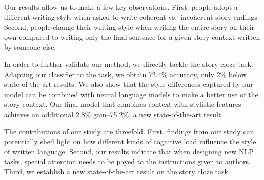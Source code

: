 \documentclass[11pt,a4paper]{article}
\newcommand{\secref}[1]{Section~\ref{ssec:#1}}
\newcommand{\com}[1]{}
\newcommand{\resolved}[1]{}
\newcommand{\shortv}[1]{}
\newcommand{\roy}[1]{{\color{orange}\textsc{[#1 --rs]}}}
\newcommand{\nascomment}[1]{{\color{blue}\textsc{[#1 --nas]}}}
\newcommand{\clinic}[1]{{\color{magenta}\textsc{[#1 --CLINIC]}}}
\renewcommand{\roy}[1]{{\color{orange}[#1 --rs]}}
\renewcommand{\roy}[1]{#1}
\renewcommand{\nascomment}[1]{}
\begin{document}
Our results allow us to make a few key observations.
First, people adopt a different writing style when asked to write coherent vs.~incoherent story endings.
Second,  people change their writing style when writing the entire story on their own compared to 
writing only the final sentence for a given story context written by someone else.


In order to further validate our method, we directly tackle the
story cloze task\nascomment{cite the challenge?  a reader may
  not realize that there is a shared task on this}\resolved{\roy{Maybe ``challenge'' was not the right term here. We basically mean the story cloze task. The shared task was the original task w/o any modification, so I am not referring to it specifically here}}. 
 Adapting our classifier to the task, we obtain 72.4\% accuracy, \com{a
 12.5\% increase over the previously reported state-of-the-art  \cite{Salle:2016}}\roy{only 2\% below state-of-the-art results}.
We also show that the style differences captured by our model can be combined with neural language models to make a better use of the story context. 
Our final model that combines context with stylistic features achieves an additional 2.8\% gain--75.2\%,  a new state-of-the-art result.\com{, 15.3\% better than the best
published result}

\com{Our results suggest that writing style is affected by the the writer's state of mind.
Writing a sentence intended to be {\it wrong} turns out quite differently than a sentence intended to be {\it right}. 
Similarly, writing a sentence as part of the story is different from reading a story, and then writing the final sentence.}

The contributions of our study are threefold. 
First, findings from our study can potentially shed light on 
how different kinds of cognitive load influence the style of written language. 
Second, our results indicate that when designing new NLP tasks, special attention needs to be payed to the instructions given to authors.
Third, we establish a new state-of-the-art result on the \shortv{commonsense }story cloze task. 

\com{
The remainder of this paper is organized as follows. In \secref{ROC_Story} we describe the story cloze task.
We then present our model, experiments and results in Sections \ref{ssec:Model}, \ref{ssec:Experiments} and \ref{ssec:Results} respectively.
Sections \ref{ssec:Ablation} and \ref{ssec:Discussion} present a further analysis of our results  and a discussion, followed by related work and conclusions.\clinic{Omit this paragraph?}}
\end{document}
